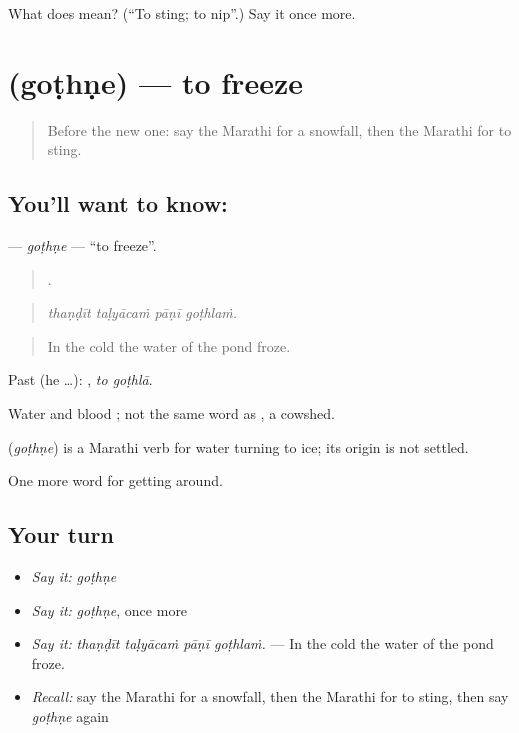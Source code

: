 \begin{tcolorbox}[breakable,colback=teal!4,colframe=teal!35!black,title={Before you move on}]
What does  mean? (\textquotedblleft{}To sting; to nip\textquotedblright{}.) Say it once more.
\end{tcolorbox}
\section[\texorpdfstring{\mr{गोठणे} (goṭhṇe)}{गोठणे (goṭhṇe)}]{ (goṭhṇe) — to freeze}

\label{lesson:MR-C437-gothne}



\begin{quote}
Before the new one: say the Marathi for a snowfall, then the Marathi for to sting.
\end{quote}

\subsection*{You'll want to know: }
\textbf{} — \emph{goṭhṇe} — \textquotedblleft{}to freeze\textquotedblright{}.

\begin{quote}
   .
\end{quote}

\begin{quote}
\emph{thaṇḍīt taḷyācaṁ pāṇī goṭhlaṁ.}
\end{quote}

\begin{quote}
In the cold the water of the pond froze.
\end{quote}

Past (he …):  , \emph{to goṭhlā}.

Water and blood ; not the same word as , a cowshed.

\begin{cousinweb}
\textbf{} (\emph{goṭhṇe}) is a Marathi verb for water turning to ice; its origin is not settled.
\end{cousinweb}

\begin{grammarlens}[title={What you've built}]
One more word for getting around.
\end{grammarlens}

\subsection*{Your turn}
\begin{itemize}
\raggedright
  \item \emph{Say it:} \emph{goṭhṇe}
  \item \emph{Say it:} \emph{goṭhṇe}, once more
  \item \emph{Say it:} \emph{thaṇḍīt taḷyācaṁ pāṇī goṭhlaṁ.} — In the cold the water of the pond froze.
  \item \emph{Recall:} say the Marathi for a snowfall, then the Marathi for to sting, then say \emph{goṭhṇe} again
\end{itemize}

